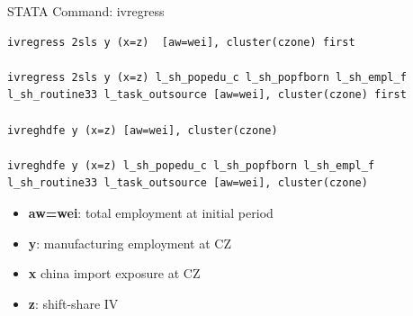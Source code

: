 \documentclass[dvipsnames,hyperref={pdfpagelabels=false}]{beamer}
\begin{document}
\begin{frame}[fragile]{STATA Command: ivregress}
\begin{lstlisting}
ivregress 2sls y (x=z)  [aw=wei], cluster(czone) first

ivregress 2sls y (x=z) l_sh_popedu_c l_sh_popfborn l_sh_empl_f l_sh_routine33 l_task_outsource [aw=wei], cluster(czone) first

ivreghdfe y (x=z) [aw=wei], cluster(czone)

ivreghdfe y (x=z) l_sh_popedu_c l_sh_popfborn l_sh_empl_f l_sh_routine33 l_task_outsource [aw=wei], cluster(czone)
\end{lstlisting}
	\begin{itemize}
		
		\vspace{0.2cm}
		\item  \textbf{aw=wei}: total employment at initial period
		\vspace{0.2cm}
		\item \textbf{y}: manufacturing employment at CZ
		\vspace{0.2cm}
		\item \textbf{x} china import exposure at CZ
		\vspace{0.2cm}
		\item \textbf{z}: shift-share IV 
	\end{itemize}
\end{frame}







%	
%		
%		
\end{document}
